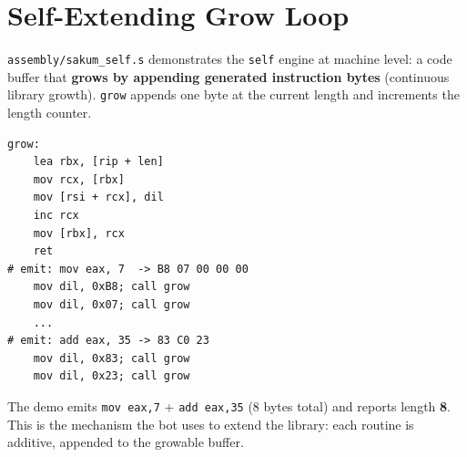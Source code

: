 \section{Self-Extending Grow Loop}\label{ch:self}

\texttt{assembly/sakum\_self.s} demonstrates the \texttt{self} engine at
machine level: a code buffer that \textbf{grows by appending generated
instruction bytes} (continuous library growth).  \texttt{grow} appends one
byte at the current length and increments the length counter.

\begin{lstlisting}[language=SakumAsm,caption={grow + emit (sakum\_self.s:14, :31).}]
grow:
    lea rbx, [rip + len]
    mov rcx, [rbx]
    mov [rsi + rcx], dil
    inc rcx
    mov [rbx], rcx
    ret
# emit: mov eax, 7  -> B8 07 00 00 00
    mov dil, 0xB8; call grow
    mov dil, 0x07; call grow
    ...
# emit: add eax, 35 -> 83 C0 23
    mov dil, 0x83; call grow
    mov dil, 0x23; call grow
\end{lstlisting}

The demo emits \texttt{mov eax,7} + \texttt{add eax,35} (8 bytes total)
and reports length \textbf{8}.  This is the mechanism the bot uses to extend
the library: each routine is additive, appended to the growable buffer.
